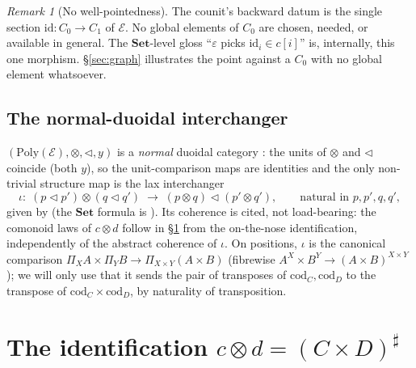 \documentclass[11pt]{amsart}
\theoremstyle{plain}
\theoremstyle{definition}
\theoremstyle{remark}
\newtheorem{remark}[theorem]{Remark}
\newcommand{\Set}{\mathbf{Set}}
\newcommand{\Poly}{\mathrm{Poly}}
\newcommand{\Ee}{\mathcal{E}}
\newcommand{\sub}{\triangleleft}      %
\newcommand{\dir}[1]{[#1]}
\newcommand{\sharpc}[1]{#1^{\sharp}}   %
\newcommand{\id}{\mathrm{id}}
\newcommand{\cod}{\mathrm{cod}}
\begin{document}
\begin{remark}[No well-pointedness]\label{rem:wp}
The counit's backward datum is the single section $\id:C_0\to C_1$ of $\Ee$. No global elements of
$C_0$ are chosen, needed, or available in general. The $\Set$-level gloss ``$\varepsilon$ picks
$\id_i\in c\dir{i}$'' is, internally, this one morphism. \S\ref{sec:graph} illustrates the point
against a $C_0$ with no global element whatsoever.
\end{remark}

\subsection{The normal-duoidal interchanger}\label{sub:interchanger}

$(\Poly(\Ee),\otimes,\sub,y)$ is a \emph{normal} duoidal category \cite[Thm.~4.5]{ShapiroSpivak2023}:
the units of $\otimes$ and $\sub$ coincide (both $y$), so the unit-comparison maps are identities and
the only non-trivial structure map is the lax interchanger
\begin{equation}\label{eq:iota}
  \iota:\;(p\sub p')\otimes(q\sub q')\;\longrightarrow\;(p\otimes q)\sub(p'\otimes q'),
  \qquad\text{natural in }p,p',q,q',
\end{equation}
given by \cite[Thm.~4.5, eq.~(16)]{ShapiroSpivak2023} (the $\Set$ formula is \cite[Ex.~4.6]{ShapiroSpivak2023}).
Its coherence is cited, not load-bearing: the comonoid laws of $c\otimes d$ follow in
\S\ref{sec:setI} from the on-the-nose identification, independently of the abstract coherence of
$\iota$. On positions, $\iota$ is the canonical comparison
$\Pi_X A\times\Pi_Y B\to\Pi_{X\times Y}(A\times B)$ (fibrewise $A^X\times B^Y\to(A\times B)^{X\times Y}$);
we will only use that it sends the pair of transposes of $\cod_C,\cod_D$ to the transpose of
$\cod_C\times\cod_D$, by naturality of transposition.

\section{The identification \texorpdfstring{$c\otimes d=\sharpc{(C\times D)}$}{c tensor d = (CxD)sharp}}\label{sec:setI}
\end{document}
